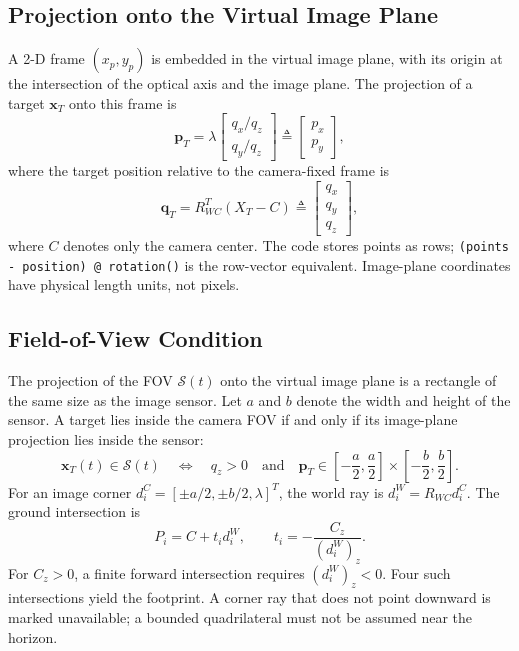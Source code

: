 \documentclass[11pt,letterpaper]{article}
\begin{document}
\subsection{Projection onto the Virtual Image Plane}
A 2-D frame $(x_p,y_p)$ is embedded in the virtual image plane, with its origin at the intersection of the optical axis and the image plane. The projection of a target $\mathbf{x}_T$ onto this frame is
\begin{equation}
\mathbf{p}_T = \lambda \begin{bmatrix} q_x / q_z \\ q_y / q_z \end{bmatrix} \triangleq \begin{bmatrix} p_x \\ p_y \end{bmatrix},
\label{eq:projection}
\end{equation}
where the target position relative to the camera-fixed frame is
\begin{equation}
\mathbf{q}_T = R_{WC}^{T}(X_T-C) \triangleq \begin{bmatrix} q_x \\ q_y \\ q_z \end{bmatrix},
\label{eq:qT}
\end{equation}
where $C$ denotes only the camera center. The code stores points as rows; \texttt{(points - position) @ rotation()} is the row-vector equivalent. Image-plane coordinates have physical length units, not pixels.

\subsection{Field-of-View Condition}
The projection of the FOV $\mathcal{S}(t)$ onto the virtual image plane is a rectangle of the same size as the image sensor. Let $a$ and $b$ denote the width and height of the sensor. A target lies inside the camera FOV if and only if its image-plane projection lies inside the sensor:
\begin{equation}
\mathbf{x}_T(t) \in \mathcal{S}(t) \quad \Leftrightarrow \quad
q_z>0\quad\text{and}\quad \mathbf{p}_T \in \left[-\frac{a}{2},\frac{a}{2}\right] \times \left[-\frac{b}{2},\frac{b}{2}\right].
\label{eq:fov}
\end{equation}
For an image corner $d_i^C=[\pm a/2,\pm b/2,\lambda]^T$, the world ray is $d_i^W=R_{WC}d_i^C$. The ground intersection is
\begin{equation}
P_i=C+t_i d_i^W,\qquad t_i=-\frac{C_z}{(d_i^W)_z}.
\end{equation}
For $C_z>0$, a finite forward intersection requires $(d_i^W)_z<0$. Four such intersections yield the footprint. A corner ray that does not point downward is marked unavailable; a bounded quadrilateral must not be assumed near the horizon.
\end{document}
